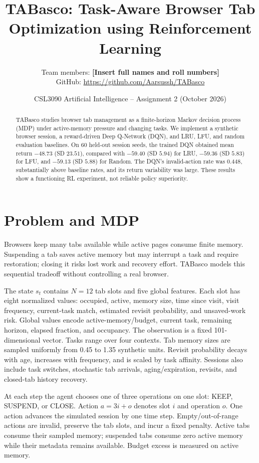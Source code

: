 \documentclass[10pt,twocolumn]{article}
\title{TABasco: Task-Aware Browser Tab Optimization using Reinforcement Learning}
\author{Team members: \textbf{[Insert full names and roll numbers]}\\GitHub: \url{https://github.com/Aarsussh/TABasco}}
\date{CSL3090 Artificial Intelligence -- Assignment 2 (October 2026)}
\begin{document}
\maketitle
\begin{abstract}\small
TABasco studies browser tab management as a finite-horizon Markov decision process (MDP) under active-memory pressure and changing tasks. We implement a synthetic browser session, a reward-driven Deep Q-Network (DQN), and LRU, LFU, and random evaluation baselines. On 60 held-out session seeds, the trained DQN obtained mean return $-48.73$ (SD $23.51$), compared with $-59.40$ (SD $5.94$) for LRU, $-59.36$ (SD $5.83$) for LFU, and $-59.13$ (SD $5.88$) for Random. The DQN's invalid-action rate was $0.448$, substantially above baseline rates, and its return variability was large. These results show a functioning RL experiment, not reliable policy superiority.
\end{abstract}
\section{Problem and MDP}
Browsers keep many tabs available while active pages consume finite memory. Suspending a tab saves active memory but may interrupt a task and require restoration; closing it risks lost work and recovery effort. TABasco models this sequential tradeoff without controlling a real browser.

The state $s_t$ contains $N=12$ tab slots and five global features. Each slot has eight normalized values: occupied, active, memory size, time since visit, visit frequency, current-task match, estimated revisit probability, and unsaved-work risk. Global values encode active-memory/budget, current task, remaining horizon, elapsed fraction, and occupancy. The observation is a fixed 101-dimensional vector. Tasks range over four contexts. Tab memory sizes are sampled uniformly from 0.45 to 1.35 synthetic units. Revisit probability decays with age, increases with frequency, and is scaled by task affinity. Sessions also include task switches, stochastic tab arrivals, aging/expiration, revisits, and closed-tab history recovery.

At each step the agent chooses one of three operations on one slot: KEEP, SUSPEND, or CLOSE. Action $a=3i+o$ denotes slot $i$ and operation $o$. One action advances the simulated session by one time step. Empty/out-of-range actions are invalid, preserve the tab slots, and incur a fixed penalty. Active tabs consume their sampled memory; suspended tabs consume zero active memory while their metadata remains available. Budget excess is measured on active memory.
\end{document}
